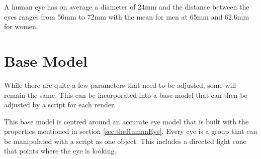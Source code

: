 A human eye has on average a diameter of 24mm and the distance between the eyes ranges from 56mm to 72mm with the mean for men at 65mm and 62.6mm for women. \cite{gross:opticalSystems}
\section{Base Model}
\label{sec:theModel}

While there are quite a few parameters that need to be adjusted, some will remain the same. This can be incorporated into a base model that can then be adjusted by a script for each render.

This base model is centred around an accurate eye model that is built with the properties mentioned in section \ref{sec:theHumanEye}. Every eye is a group that can be manipulated with a script as one object. This includes a directed light cone that points where the eye is looking.

